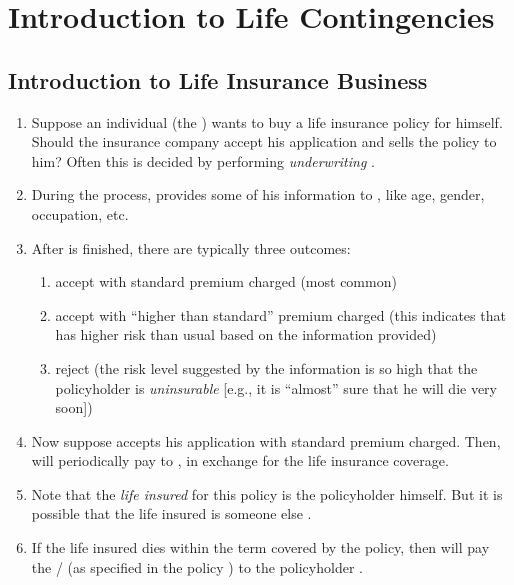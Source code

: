 \section{Introduction to Life Contingencies}
\subsection{Introduction to Life Insurance Business}
\begin{enumerate}
\item Suppose an individual  (the ) wants to buy
a life insurance policy for himself.  Should the insurance company
 accept his application and sells the policy 
to him? Often this is decided by performing \emph{underwriting} .

\item During the   process,  provides some of his
information to , like age, gender, occupation, etc.

\item After  is finished, there are typically three outcomes:
\begin{enumerate}

\item accept with standard premium charged (most common)

\item accept with ``higher than standard'' premium charged (this indicates that
 has higher risk than usual based on the information provided)

\item reject (the risk level suggested by the information is so high that the
policyholder is \emph{uninsurable} [e.g., it is ``almost'' sure that he will
die very soon])
\end{enumerate}

\item Now suppose  accepts his application with standard premium
charged. Then,  will periodically pay  \faDollarSign{}
to , in exchange for the life insurance coverage.

\item Note that the \emph{life insured} for this policy is the policyholder
 himself. But it is possible that the life insured is someone else
.

\item If the life insured  dies within the term covered by the
policy, then  will pay the /  (as specified in the policy
) to the policyholder .


\end{enumerate}
